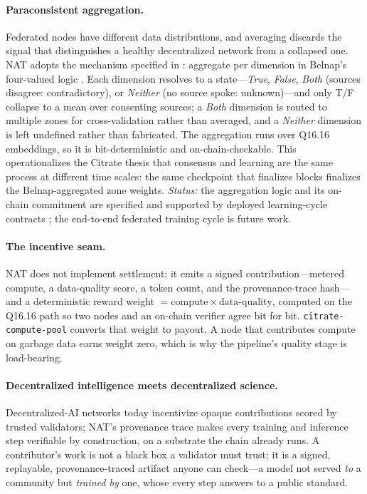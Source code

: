 \documentclass[11pt]{article}
\newcommand{\Qff}{Q16.16}
\begin{document}
\paragraph{Paraconsistent aggregation.}
Federated nodes have different data distributions, and averaging discards the signal that
distinguishes a healthy decentralized network from a collapsed one. NAT adopts the mechanism specified
in \citet{citrate2}: aggregate per dimension in Belnap's four-valued logic \citep{belnap1977useful}.
Each dimension resolves to a state---\emph{True}, \emph{False}, \emph{Both} (sources disagree:
contradictory), or \emph{Neither} (no source spoke: unknown)---and only T/F collapse to a mean over
consenting sources; a \emph{Both} dimension is routed to multiple zones for cross-validation rather
than averaged, and a \emph{Neither} dimension is left undefined rather than fabricated. The
aggregation runs over \Qff{} embeddings, so it is bit-deterministic and on-chain-checkable. This
operationalizes the Citrate thesis that consensus and learning are the same process at different time
scales: the same checkpoint that finalizes blocks finalizes the Belnap-aggregated zone weights.
\emph{Status:} the aggregation logic and its on-chain commitment are specified and supported by
deployed learning-cycle contracts \citep{citrate2}; the end-to-end federated training cycle is future
work.

\paragraph{The incentive seam.}
NAT does not implement settlement; it emits a signed contribution---metered compute, a data-quality
score, a token count, and the provenance-trace hash---and a deterministic reward weight $=
\mathrm{compute}\times\mathrm{data\text{-}quality}$, computed on the \Qff{} path so two nodes and an
on-chain verifier agree bit for bit. \texttt{citrate-compute-pool} converts that weight to payout. A
node that contributes compute on garbage data earns weight zero, which is why the pipeline's quality
stage is load-bearing.

\paragraph{Decentralized intelligence meets decentralized science.}
Decentralized-AI networks today incentivize opaque contributions scored by trusted validators; NAT's
provenance trace makes every training and inference step verifiable by construction, on a substrate
the chain already runs. A contributor's work is not a black box a validator must trust; it is a
signed, replayable, provenance-traced artifact anyone can check---a model not served \emph{to} a
community but \emph{trained by} one, whose every step answers to a public standard.
\end{document}
